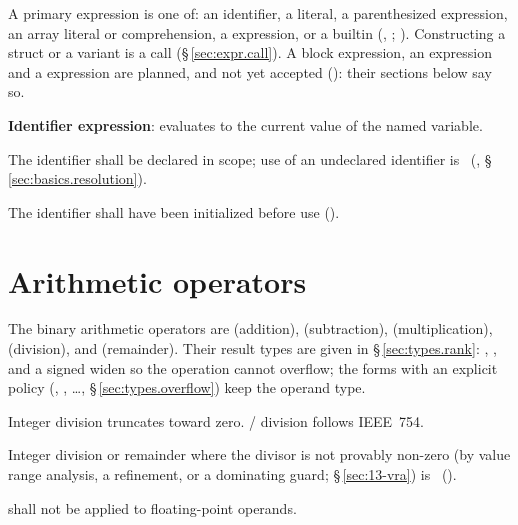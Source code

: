\pnum
A primary expression is one of: an identifier, a literal, a parenthesized
expression, an array literal or comprehension, a  expression, or a builtin
(, ; ).  Constructing a struct or a variant is a
call (\S\,\ref{sec:expr.call}).  A block expression, an  expression and a
 expression are planned, and not yet accepted (): their sections
below say so.

\pnum
\textbf{Identifier expression}: evaluates to the current value of the named
variable.

\begin{constraint}
  The identifier shall be declared in scope; use of an undeclared identifier
  is \illformed{}~(, \S\,\ref{sec:basics.resolution}).
\end{constraint}

\begin{constraint}
  The identifier shall have been initialized before use
  ().
\end{constraint}

\section{Arithmetic operators}
\label{sec:expr.arith}

\pnum
The binary arithmetic operators are \lain{+} (addition), \lain{-}
(subtraction), \lain{*} (multiplication), \lain{/} (division), and
\lain{\%} (remainder).  Their result types are given in \S\,\ref{sec:types.rank}: \lain{+},
\lain{-}, \lain{*} and a signed \lain{/} widen so the operation cannot overflow; the forms
with an explicit policy (\lain{+\%}, \lain{/|}, \ldots, \S\,\ref{sec:types.overflow}) keep the
operand type.

\pnum
Integer division truncates toward zero.  / division
follows IEEE~754.

\begin{constraint}
  Integer division or remainder where the divisor is not provably non-zero (by value range
  analysis, a  refinement, or a dominating guard; \S\,\ref{sec:13-vra}) is
  \illformed{}~().
\end{constraint}

\begin{constraint}
  \lain{\%} shall not be applied to floating-point operands.
\end{constraint}


